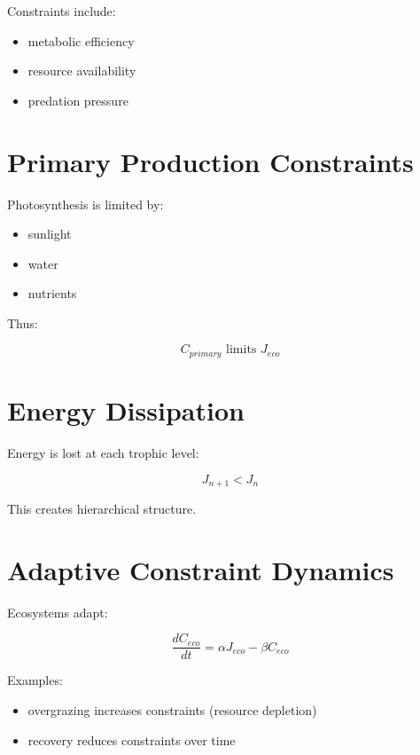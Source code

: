\documentclass[11pt]{article}
\begin{document}
Constraints include:

\begin{itemize}
    \item metabolic efficiency
    \item resource availability
    \item predation pressure
\end{itemize}

\section{Primary Production Constraints}

Photosynthesis is limited by:

\begin{itemize}
    \item sunlight
    \item water
    \item nutrients
\end{itemize}

Thus:

\begin{equation}
C_{primary} \text{ limits } J_{eco}
\end{equation}

\section{Energy Dissipation}

Energy is lost at each trophic level:

\begin{equation}
J_{n+1} < J_n
\end{equation}

This creates hierarchical structure.

\section{Adaptive Constraint Dynamics}

Ecosystems adapt:

\begin{equation}
\frac{dC_{eco}}{dt} = \alpha J_{eco} - \beta C_{eco}
\end{equation}

Examples:

\begin{itemize}
    \item overgrazing increases constraints (resource depletion)
    \item recovery reduces constraints over time
\end{itemize}
\end{document}
